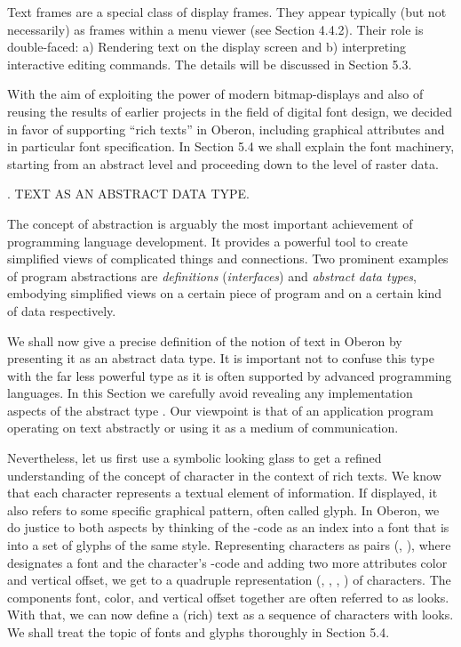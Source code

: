 Text frames are a special class of display frames. They appear
typically (but not necessarily) as frames within a menu viewer (see
Section 4.4.2). Their role is double-faced: a) Rendering text on the
display screen and b) interpreting interactive editing commands. The
details will be discussed in Section 5.3.

With the aim of exploiting the power of modern bitmap-displays and
also of reusing the results of earlier projects in the field of
digital font design, we decided in favor of supporting ``rich texts'' in
Oberon, including graphical attributes and in particular font
specification. In Section 5.4 we shall explain the font machinery,
starting from an abstract level and proceeding down to the level of
raster data.

. TEXT AS AN ABSTRACT DATA TYPE.

The concept of abstraction is arguably the most important achievement
of programming language development. It provides a powerful tool to
create simplified views of complicated things and connections. Two
prominent examples of program abstractions are \emph{definitions}
(\emph{interfaces}) and \emph{abstract data types}, embodying simplified views on a certain piece of program and on a certain kind of data respectively.

We shall now give a precise definition of the notion of text in Oberon
by presenting it as an abstract data type. It is important not to
confuse this type with the far less powerful type  as it is
often supported by advanced programming languages. In this Section we
carefully avoid revealing any implementation aspects of the abstract
type . Our viewpoint is that of an application program operating on text abstractly or using it as a medium of communication.

Nevertheless, let us first use a symbolic looking glass to get a
refined understanding of the concept of character in the context of
rich texts. We know that each character represents a textual element
of information. If displayed, it also refers to some specific
graphical pattern, often called glyph. In Oberon, we do justice to
both aspects by thinking of the -code as an index into a font
that is into a set of glyphs of the same style. Representing
characters as pairs (, ), where  designates a font and 
the character's -code and adding two more attributes color and
vertical offset, we get to a quadruple representation (, , , ) of characters. The components font, color, and vertical offset together are often referred to as looks. With that, we can now define a (rich) text as a sequence of characters with looks. We shall treat the topic of fonts and glyphs thoroughly in Section 5.4.

